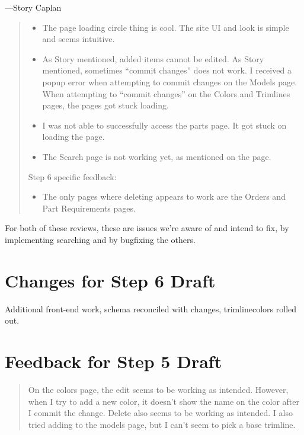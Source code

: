 \documentclass[11pt,letterpaper,oneside]{amsart}
\begin{document}
---Story Caplan

\begin{quotation}

\begin{itemize}

\item The page loading circle thing is cool. The site UI and look is simple and seems intuitive.
\item           As Story mentioned, added items cannot be edited.
           As Story mentioned, sometimes “commit changes” does not work. I received a popup error when attempting to commit changes on the Models page. When attempting to “commit changes” on the Colors and Trimlines pages, the pages got stuck loading.
\item           I was not able to successfully access the parts page. It got stuck on loading the page.
\item          The Search page is not working yet, as mentioned on the page.

\end{itemize}

Step 6 specific feedback:
 

 \begin{itemize}
 \item          The only pages where deleting appears to work are the Orders and Part Requirements pages.
 \end{itemize}

\end{quotation}

For both of these reviews, these are issues we're aware of and intend to fix, by implementing searching and by bugfixing the others.

\section*{Changes for Step 6 Draft}

Additional front-end work, schema reconciled with changes, trimline\textunderscore colors rolled out.

\section*{Feedback for Step 5 Draft}

\begin{quotation}
On the colors page, the edit seems to be working as intended.  However, when I try to add a new color, it doesn't show the name on the color after I commit the change.  Delete also seems to be working as intended.  I also tried adding to the models page, but I can't seem to pick a base trimline.
\end{quotation}
\end{document}
